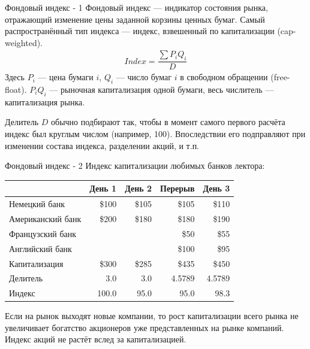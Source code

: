 \documentclass{beamer}
\begin{document}
\begin{frame}{Фондовый индекс - 1}
\justify
Фондовый индекс --- индикатор состояния рынка, отражающий изменение цены 
заданной корзины ценных бумаг. Самый распространённый тип индекса --- индекс, 
взвешенный по капитализации (cap-weighted).
\begin{align*}
Index = \dfrac{\sum P_iQ_i}{D}
\end{align*}
Здесь $P_i$ --- цена бумаги $i$, $Q_i$ --- число бумаг $i$ в свободном 
обращении (free-float). $P_iQ_i$ --- рыночная капитализация одной бумаги,
весь числитель --- капитализация рынка.

\justify
Делитель $D$ обычно подбирают так, чтобы в момент самого первого расчёта индекс 
был круглым числом (например, 100). Впоследствии его подправляют при изменении 
состава индекса, разделении акций, и т.п.
\end{frame}



\begin{frame}{Фондовый индекс - 2}
\justify
Индекс капитализации любимых банков лектора:

\justify
\centering
\begin{tabular}{l|r|r|r|r}
                  & День 1 & День 2 & Перерыв & День 3 \\ \hline
Немецкий банк     & \$100  & \$105  & \$105   & \$110 \\
Американский банк & \$200  & \$180  & \$180   & \$190 \\
Французский банк  &        &        & \$50    & \$55  \\
Английский банк   &        &        & \$100   & \$95  \\ \hline
Капитализация     & \$300  & \$285  & \$435   & \$450 \\
Делитель          & 3.0    & 3.0    & 4.5789  & 4.5789 \\ \hline
Индекс            & 100.0  & 95.0   & 95.0    & 98.3
\end{tabular}

\justify
Если на рынок выходят новые компании, то рост капитализации всего рынка не 
увеличивает богатство акционеров уже представленных на рынке компаний. Индекс 
акций не растёт вслед за капитализацией.
\end{frame}
\end{document}
